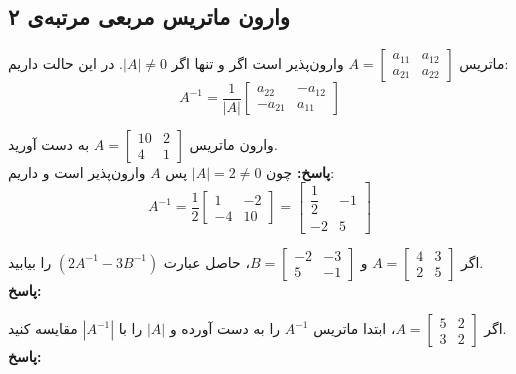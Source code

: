 \subsection{وارون ماتریس مربعی مرتبه‌ی ۲}

\begin{theorem}
	ماتریس
	$A=
	\begin{bmatrix}
		a_{11} & a_{12} \\
		a_{21} & a_{22}
	\end{bmatrix}$
	وارون‌پذیر است اگر و تنها اگر
	$|A| \neq 0$.
	در این حالت داریم:
	\[
	A^{-1} = \frac{1}{|A|}
	\begin{bmatrix}
		a_{22} & -a_{12} \\
		-a_{21} & a_{11}
	\end{bmatrix}
	\]
\end{theorem}

\begin{example}
	وارون ماتریس
	$A=
	\begin{bmatrix}
		10 & 2 \\
		4 & 1
	\end{bmatrix}$
	به دست آورید. \\
	\textbf{پاسخ:}
	چون
	$|A|=2 \neq 0$
	پس $A$ وارون‌پذیر است و داریم:
	\[
	A^{-1}=\frac{1}{2}
	\begin{bmatrix}
		1 & -2 \\
		-4 & 10
	\end{bmatrix}
	=
	\begin{bmatrix}
		\dfrac{1}{2} & -1 \\
		-2 & 5
	\end{bmatrix}
	\]
\end{example}

\begin{example}
	اگر
	$A=
	\begin{bmatrix}
		4 & 3 \\
		2 & 5
	\end{bmatrix}$
	و
	$B=
	\begin{bmatrix}
		-2 & -3 \\
		5 & -1
	\end{bmatrix}$،
	حاصل عبارت
	$(2A^{-1}-3B^{-1})$
	را بیابید. \\
	\textbf{پاسخ:}
\end{example}

\begin{example}
	اگر
	$A=
	\begin{bmatrix}
		5 & 2 \\
		3 & 2
	\end{bmatrix}$،
	ابتدا ماتریس
	$A^{-1}$
	را به دست آورده و $|A|$ را با $|A^{-1}|$ مقایسه کنید. \\
	\textbf{پاسخ:}
\end{example}

